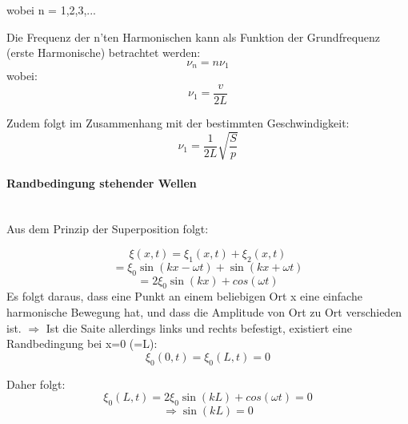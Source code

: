 \documentclass[7pt]{article}
\begin{document}
\begin{multicols*}{3}
wobei n = 1,2,3,... \newline

Die Frequenz der n'ten Harmonischen kann als Funktion der Grundfrequenz (erste Harmonische) betrachtet werden:
\begin{equation*}
\nu _n = n \nu _1
\end{equation*}
wobei:
\begin{equation*}
\nu _1 = \frac{v}{2L} 
\end{equation*}

Zudem folgt im Zusammenhang mit der bestimmten Geschwindigkeit:
\begin{equation*}
\nu _1 = \frac{1}{2L}  \sqrt{\frac{S}{p}}
\end{equation*}

\paragraph{Randbedingung stehender Wellen}\mbox{}\\
Aus dem Prinzip der Superposition folgt:

\begin{equation*}
\xi(x,t) = \xi _1(x,t) + \xi _2(x,t)
\end{equation*}
\begin{equation*}
= \xi _0 \sin(kx-\omega t) + \sin(kx+\omega t)
\end{equation*}
\begin{equation*}
= 2 \xi _0 \sin(kx) + cos(\omega t)
\end{equation*}
\newline
Es folgt daraus, dass eine Punkt an einem beliebigen Ort x eine einfache harmonische Bewegung hat, und dass die Amplitude von Ort zu Ort verschieden ist.\newline
$\Longrightarrow$ Ist die Saite allerdings links und rechts befestigt, existiert eine Randbedingung bei x=0 (=L):
\begin{equation*}
\xi _0 (0,t) = \xi _0 (L,t) = 0
\end{equation*}

Daher folgt:
\begin{equation*}
\xi _0 (L,t) = 2 \xi _0 \sin(kL) + cos(\omega t) = 0
\end{equation*}
\begin{equation*}
	\Longrightarrow \sin(kL) = 0
\end{equation*}


\end{multicols*}
\end{document}
